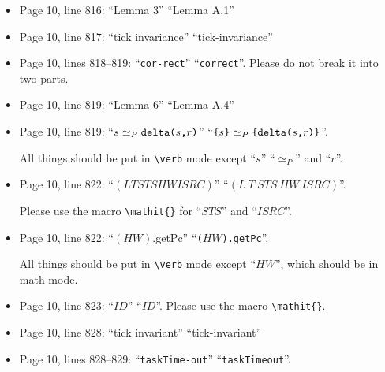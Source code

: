 \documentclass[12pt,onecolumn]{IEEEtranTIE}
\begin{document}
\begin{itemize}
Note: 

-- All things should be put in \verb|\verb| mode except ``$L$''
``$T$'' ``$\mathit{STS}$'' ``$HW$'' ``$\mathit{ISRC}$''
``$\mathit{ID}$'' and ``$0$'', which should be in math mode.

-- Please use the macro \verb|\mathit{}| for ``$\mathit{STS}$''
``$\mathit{ISRC}$'' and ``$\mathit{ID}$''.

-- ``\verb|mteTask|'' and ``\verb|mteIS|'' should be aligned with each
other.

-- The last period should be in text mode.


\item Page 10, line 816: ``Lemma 3'' \by ``Lemma A.1''

\item Page 10, line 817: ``tick invariance'' \by ``tick-invariance''

\item Page 10, lines 818--819: ``\verb|cor-rect|'' \by
  ``\verb|correct|''.  Please do not break it into two parts.

\item Page 10, line 819: ``Lemma 6'' \by ``Lemma A.4''

\item Page 10, line 819:
  ``$\relax{s}\simeq_P\texttt{delta(}\relax{s}\texttt{,}\relax{r}\texttt{)}$'' \by
  ``$\verb|{|s\verb|}|\simeq_P\verb|{|\deltaS{s}{r}\verb|}|$''. 

All things should be put in \verb|\verb| mode except ``$s$''
``$\simeq_P$'' and ``$r$''.

\item Page 10, line 822: ``$(L T STS HW ISRC)$'' \by
  ``$(L~T~\mathit{STS}~\mathit{HW}~\mathit{ISRC})$''. 

Please use the macro \verb|\mathit{}| for ``$\mathit{STS}$'' and
``$\mathit{ISRC}$''.


\item Page 10, line 822: ``$(HW)$.getPc'' \by
  ``\verb|(|$HW$\verb|).getPc|''.

All things should be put in \verb|\verb| mode except ``$HW$'', which
should be in math mode.


\item Page 10, line 823: ``$ID$'' \by ``$\mathit{ID}$''. Please use
  the macro \verb|\mathit{}|.

\item Page 10, line 828: ``tick invariant'' \by ``tick-invariant''

\item Page 10, lines 828--829: ``\verb|taskTime-out|'' \by
  ``\verb|taskTimeout|''. 


\end{itemize}
\end{document}
